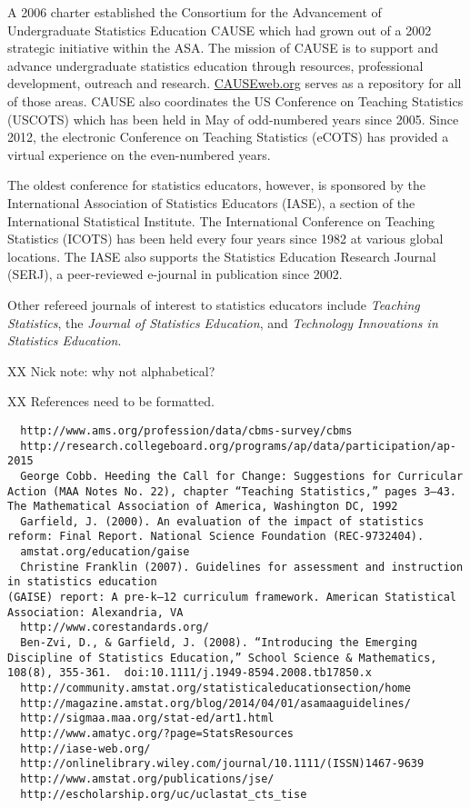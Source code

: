 A 2006 charter established the Consortium for the Advancement of Undergraduate Statistics Education CAUSE which had grown out of a 2002 strategic initiative within the ASA.  The mission of CAUSE is to support and advance undergraduate statistics education through resources, professional development, outreach and research.  \url{CAUSEweb.org} serves as a repository for all of those areas.  CAUSE also coordinates the US Conference on Teaching Statistics (USCOTS) which has been held in May of odd-numbered years since 2005.  Since 2012, the electronic Conference on Teaching Statistics (eCOTS) has provided a virtual experience on the even-numbered years.

The oldest conference for statistics educators, however, is sponsored by the International Association of Statistics Educators (IASE), a section of the International Statistical Institute.  The International Conference on Teaching Statistics (ICOTS) has been held every four years since 1982 at various global locations.  The IASE also supports the Statistics Education Research Journal (SERJ), a peer-reviewed e-journal in publication since 2002.

Other refereed journals of interest to statistics educators include \emph{Teaching Statistics}, the \emph{Journal of Statistics Education}, and \emph{Technology Innovations in Statistics Education}.

XX Nick note: why not alphabetical?



XX References need to be formatted.

\begin{verbatim}
  http://www.ams.org/profession/data/cbms-survey/cbms
  http://research.collegeboard.org/programs/ap/data/participation/ap-2015
  George Cobb. Heeding the Call for Change: Suggestions for Curricular Action (MAA Notes No. 22), chapter “Teaching Statistics,” pages 3–43. The Mathematical Association of America, Washington DC, 1992
  Garfield, J. (2000). An evaluation of the impact of statistics reform: Final Report. National Science Foundation (REC-9732404).
  amstat.org/education/gaise
  Christine Franklin (2007). Guidelines for assessment and instruction in statistics education
(GAISE) report: A pre-k–12 curriculum framework. American Statistical Association: Alexandria, VA
  http://www.corestandards.org/
  Ben-Zvi, D., & Garfield, J. (2008). “Introducing the Emerging Discipline of Statistics Education,” School Science & Mathematics, 108(8), 355-361.  doi:10.1111/j.1949-8594.2008.tb17850.x
  http://community.amstat.org/statisticaleducationsection/home
  http://magazine.amstat.org/blog/2014/04/01/asamaaguidelines/
  http://sigmaa.maa.org/stat-ed/art1.html
  http://www.amatyc.org/?page=StatsResources
  http://iase-web.org/
  http://onlinelibrary.wiley.com/journal/10.1111/(ISSN)1467-9639
  http://www.amstat.org/publications/jse/
  http://escholarship.org/uc/uclastat_cts_tise
\end{verbatim}
